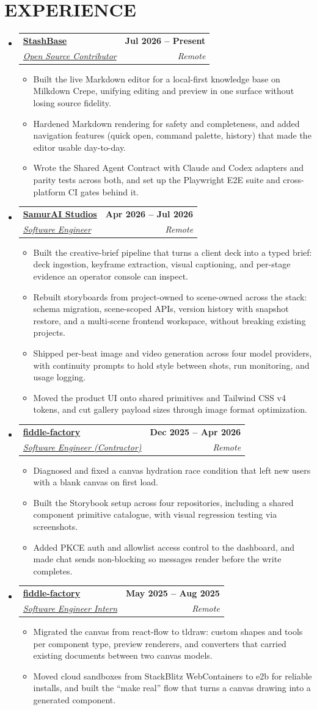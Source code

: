 \documentclass[letterpaper, 10pt]{article}
\makeatletter
\newcommand{\resumeItem}[1]{ \item\small{ {#1 \vspace{-3pt}} } }
\newcommand{\resumeSubheading}[4]{
\vspace{2pt}
\item
\begin{tabular*}{1.0\textwidth}[t]{l@{\extracolsep{\fill}}r}
  \textbf{#1} & \textbf{\small #2} \\
  \textit{\small#3} & \textit{\small #4} \\
\end{tabular*}
\vspace{-5pt}
}
\newcommand{\resumeSubHeadingListStart}{\begin{itemize}[leftmargin=0.0in, label={}]}
\newcommand{\resumeSubHeadingListEnd}{\end{itemize}}
\newcommand{\resumeItemListStart}{\begin{itemize}
\vspace{-3pt}}
\newcommand{\resumeItemListEnd}{\end{itemize}
\vspace{-5pt}}
\makeatother
\begin{document}
  \section{EXPERIENCE}
  \resumeSubHeadingListStart \resumeSubheading {\href{https://github.com/liliu-z/stashbase}{StashBase}}{Jul 2026 -- Present}
  {\underline{Open Source Contributor}}{Remote} \resumeItemListStart
  \resumeItem{\normalsize{Built the live Markdown editor for a local-first knowledge base on Milkdown Crepe, unifying editing and preview in one surface without losing source fidelity.}}
  \resumeItem{\normalsize{Hardened Markdown rendering for safety and completeness, and added navigation features (quick open, command palette, history) that made the editor usable day-to-day.}}
  \resumeItem{\normalsize{Wrote the Shared Agent Contract with Claude and Codex adapters and parity tests across both, and set up the Playwright E2E suite and cross-platform CI gates behind it.}}
  \resumeItemListEnd
  \resumeSubheading {\href{https://samur-ai.in}{SamurAI Studios}}{Apr 2026 -- Jul 2026}
  {\underline{Software Engineer}}{Remote} \resumeItemListStart
  \resumeItem{\normalsize{Built the creative-brief pipeline that turns a client deck into a typed brief: deck ingestion, keyframe extraction, visual captioning, and per-stage evidence an operator console can inspect.}}
  \resumeItem{\normalsize{Rebuilt storyboards from project-owned to scene-owned across the stack: schema migration, scene-scoped APIs, version history with snapshot restore, and a multi-scene frontend workspace, without breaking existing projects.}}
  \resumeItem{\normalsize{Shipped per-beat image and video generation across four model providers, with continuity prompts to hold style between shots, run monitoring, and usage logging.}}
  \resumeItem{\normalsize{Moved the product UI onto shared primitives and Tailwind CSS v4 tokens, and cut gallery payload sizes through image format optimization.}}
  \resumeItemListEnd
  \resumeSubheading {\href{https://fiddle.is}{fiddle-factory}}{Dec 2025 -- Apr 2026}
  {\underline{Software Engineer (Contractor)}}{Remote} \resumeItemListStart
  \resumeItem{\normalsize{Diagnosed and fixed a canvas hydration race condition that left new users with a blank canvas on first load.}}
  \resumeItem{\normalsize{Built the Storybook setup across four repositories, including a shared component primitive catalogue, with visual regression testing via screenshots.}}
  \resumeItem{\normalsize{Added PKCE auth and allowlist access control to the dashboard, and made chat sends non-blocking so messages render before the write completes.}}
  \resumeItemListEnd
  \resumeSubheading {\href{https://fiddle.is}{fiddle-factory}}{May 2025 -- Aug 2025}
  {\underline{Software Engineer Intern}}{Remote} \resumeItemListStart \resumeItem{\normalsize{Migrated the canvas from react-flow to tldraw: custom shapes and tools per component type, preview renderers, and converters that carried existing documents between two canvas models.}}
  \resumeItem{\normalsize{Moved cloud sandboxes from StackBlitz WebContainers to e2b for reliable installs, and built the ``make real'' flow that turns a canvas drawing into a generated component.}}
  \resumeItemListEnd \resumeSubHeadingListEnd
  \vspace{-14pt}
\end{document}
